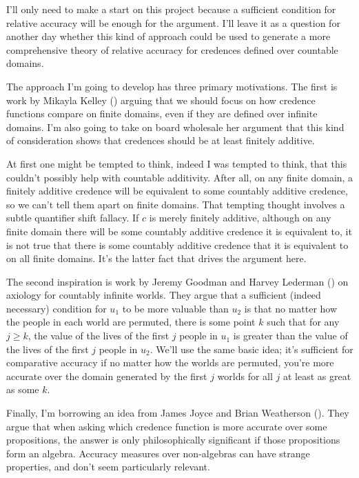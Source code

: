 \documentclass[
  11pt,
  letterpaper,
  DIV=11,
  numbers=noendperiod,
  twoside]{scrartcl}
\theoremstyle{definition}
\theoremstyle{plain}
\theoremstyle{plain}
\theoremstyle{remark}
\begin{document}
I'll only need to make a start on this project because a sufficient
condition for relative accuracy will be enough for the argument. I'll
leave it as a question for another day whether this kind of approach
could be used to generate a more comprehensive theory of relative
accuracy for credences defined over countable domains.

The approach I'm going to develop has three primary motivations. The
first is work by Mikayla Kelley ()
arguing that we should focus on how credence functions compare on finite
domains, even if they are defined over infinite domains. I'm also going
to take on board wholesale her argument that this kind of consideration
shows that credences should be at least finitely additive.

At first one might be tempted to think, indeed I was tempted to think,
that this couldn't possibly help with countable additivity. After all,
on any finite domain, a finitely additive credence will be equivalent to
some countably additive credence, so we can't tell them apart on finite
domains. That tempting thought involves a subtle quantifier shift
fallacy. If \(c\) is merely finitely additive, although on any finite
domain there will be some countably additive credence it is equivalent
to, it is not true that there is some countably additive credence that
it is equivalent to on all finite domains. It's the latter fact that
drives the argument here.

The second inspiration is work by Jeremy Goodman and Harvey Lederman
() on axiology for countably
infinite worlds. They argue that a sufficient (indeed necessary)
condition for \(u_1\) to be more valuable than \(u_2\) is that no matter
how the people in each world are permuted, there is some point \(k\)
such that for any \(j \geqslant k\), the value of the lives of the first
\(j\) people in \(u_1\) is greater than the value of the lives of the
first \(j\) people in \(u_2\). We'll use the same basic idea; it's
sufficient for comparative accuracy if no matter how the worlds are
permuted, you're more accurate over the domain generated by the first
\(j\) worlds for all \(j\) at least as great as some \(k\).

Finally, I'm borrowing an idea from James Joyce and Brian Weatherson
(). They argue that when asking
which credence function is more accurate over some propositions, the
answer is only philosophically significant if those propositions form an
algebra. Accuracy measures over non-algebras can have strange
properties, and don't seem particularly relevant.
\end{document}
